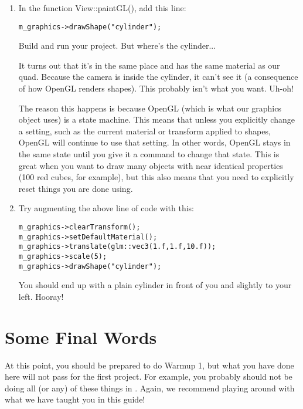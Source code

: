 \documentclass{cs195u}
\begin{document}
\begin{enumerate}
\item In the function View::paintGL(), add this line: 

\texttt{m\_graphics->drawShape("cylinder");}

Build and run your project. But where’s the cylinder...

It turns out that it’s in the same place and has the same material as our quad. Because the camera is inside the cylinder, it can’t see it (a consequence of how OpenGL renders shapes). This probably isn’t what you want. Uh-oh!

The reason this happens is because OpenGL (which is what our graphics object uses) is a state machine. This means that unless you explicitly change a setting, such as the current material or transform applied to shapes, OpenGL will continue to use that setting. In other words, OpenGL stays in the same state until you give it a command to change that state. This is great when you want to draw many objects with near identical properties (100 red cubes, for example), but this also means that you need to explicitly reset things you are done using.

\item Try augmenting the above line of code with this:

         \texttt{m\_graphics->clearTransform();}\\
         \texttt{m\_graphics->setDefaultMaterial();}\\
         \texttt{m\_graphics->translate(glm::vec3(1.f,1.f,10.f));}\\
         \texttt{m\_graphics->scale(5);}\\
         \texttt{m\_graphics->drawShape("cylinder");}
         
You should end up with a plain cylinder in front of you and slightly to your left. Hooray!

\end{enumerate}


\section*{Some Final Words}

At this point, you should be prepared to do Warmup 1, but what you have done here will not pass for the first project. For example, you probably should not be doing all (or any) of these things in . Again, we recommend playing around with what we have taught you in this guide!
\end{document}
